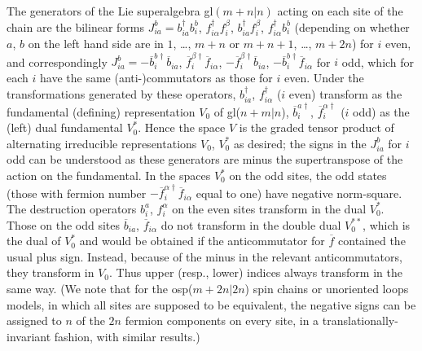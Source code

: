 \documentclass[twocolumn,floats,pra]{revtex4}
\begin{document}
The generators of the Lie superalgebra gl$(m+n|n)$ acting on each
site of the chain are the bilinear forms $J_{ia}^b= b_{ia}^\dagger
b_i^b$, $f_{i\alpha}^\dagger f_i^\beta$, $b_{ia}^\dagger
f_i^\beta$, $f_{i\alpha}^\dagger b_i^b$ (depending on whether $a$,
$b$ on the left hand side are in $1$, \ldots, $m+n$ or $m+n+1$,
\ldots, $m+2n$) for $i$ even, and correspondingly
$J_{ia}^b=-\overline{b}_i^{b\dagger} \overline{b}_{ia}$,
$\overline{f}_i^{\beta\dagger} \overline{f}_{i\alpha}$,
$-\overline{f}_i^{\beta\dagger} \overline{b}_{ia}$,
$-\overline{b}_i^{b\dagger} \overline{f}_{i\alpha}$ for $i$ odd,
which for each $i$ have the same (anti-)commutators as those for
$i$ even. Under the transformations generated by these operators,
$b_{ia}^\dagger$, $f_{i\alpha}^\dagger$ ($i$ even) transform as
the fundamental (defining) representation $V_0$ of gl($n+m|n$),
$\overline{b}_i^{a\dagger}$, $\overline{f}_i^{\alpha\dagger}$ ($i$
odd) as the (left) dual fundamental $V_0^\ast$. Hence the space
$V$ is the graded tensor product of alternating irreducible
representations $V_0$, $V_0^\ast$ as desired; the signs in the
$J_{ia}^b$ for $i$ odd can be understood as these generators are
minus the supertranspose of the action on the fundamental. In the
spaces $V_0^\ast$ on the odd sites, the odd states (those with
fermion number $-\overline{f}_i^{\alpha\dagger}
\overline{f}_{i\alpha}$ equal to one) have negative norm-square.
The destruction operators $b_i^a$, $f_i^\alpha$ on the even sites
transform in the dual $V_0^*$. Those on the odd sites
$\overline{b}_{ia}$, $\overline{f}_{i\alpha}$ do not transform in
the double dual $V_0^{**}$, which is the dual of $V_0^*$ and would
be obtained if the anticommutator for $\overline{f}$ contained the
usual plus sign. Instead, because of the minus in the relevant
anticommutators, they transform in $V_0$. Thus upper (resp.,
lower) indices always transform in the same way. (We note that for
the osp($m+2n|2n$) spin chains or unoriented loops models, in
which all sites are supposed to be equivalent, the negative signs
can be assigned to $n$ of the $2n$ fermion components on every
site, in a translationally-invariant fashion, with similar
results.)
\end{document}
